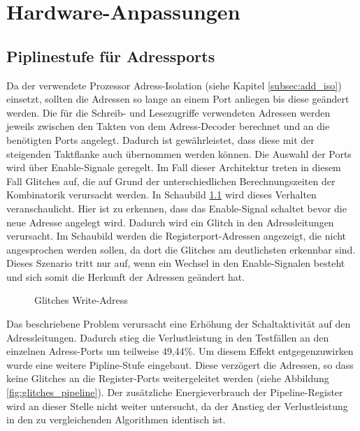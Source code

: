 \chapter{Hardware-Anpassungen}

\section{Piplinestufe für Adressports}
Da der verwendete Prozessor Adress-Isolation (siehe Kapitel \ref{subsec:add_iso}) einsetzt, sollten die Adressen so lange an einem Port anliegen bis diese geändert werden.
Die für die Schreib- und Lesezugriffe verwendeten Adressen werden jeweils zwischen den Takten von dem Adress-Decoder berechnet und an die benötigten Ports angelegt. Dadurch ist gewährleistet, dass diese mit der steigenden Taktflanke auch übernommen werden können. Die Auswahl der Ports wird über Enable-Signale geregelt. Im Fall dieser Architektur treten in diesem Fall Glitches auf, die auf Grund der unterschiedlichen Berechnungszeiten der Kombinatorik verursacht werden. In Schaubild \ref{fig:glitches} wird dieses Verhalten veranschaulicht. Hier ist zu erkennen, dass das Enable-Signal schaltet bevor die neue Adresse angelegt wird. Dadurch wird ein Glitch in den Adressleitungen verursacht. Im Schaubild werden die Registerport-Adressen angezeigt, die nicht angesprochen werden sollen, da dort die Glitches am deutlichsten erkennbar sind. Dieses Szenario tritt nur auf, wenn ein Wechsel in den Enable-Signalen besteht und sich somit die Herkunft der Adressen geändert hat.

\begin{figure}[H] 
	\centering
	
	\caption{Glitches Write-Adress}
	\label{fig:glitches}
\end{figure}


Das beschriebene Problem verursacht eine Erhöhung der Schaltaktivität auf den Adressleitungen. Dadurch stieg die Verlustleistung in den Testfällen an den einzelnen Adress-Ports um teilweise 49,44\%.
Um diesem Effekt entgegenzuwirken wurde eine weitere Pipline-Stufe eingebaut. Diese verzögert die Adressen, so dass keine Glitches an die Register-Ports weitergeleitet werden (siehe Abbildung \ref{fig:glitches_pipeline}). Der zusätzliche Energieverbrauch der Pipeline-Register wird an dieser Stelle nicht weiter untersucht, da der Anstieg der Verlustleistung in den zu vergleichenden Algorithmen identisch ist.

